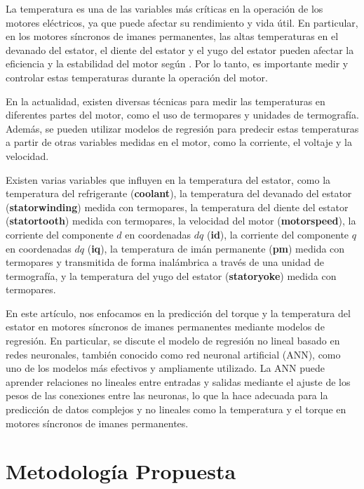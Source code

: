 \documentclass{article}
\begin{document}
La temperatura es una de las variables más críticas en la operación de los motores eléctricos, ya que puede afectar su rendimiento y vida útil. En particular, en los motores síncronos de imanes permanentes, las altas temperaturas en el devanado del estator, el diente del estator y el yugo del estator pueden afectar la eficiencia y la estabilidad del motor según \cite{li2022global}. Por lo tanto, es importante medir y controlar estas temperaturas durante la operación del motor.

En la actualidad, existen diversas técnicas para medir las temperaturas en diferentes partes del motor, como el uso de termopares y unidades de termografía. Además, se pueden utilizar modelos de regresión para predecir estas temperaturas a partir de otras variables medidas en el motor, como la corriente, el voltaje y la velocidad.

Existen varias variables que influyen en la temperatura del estator, como la temperatura del refrigerante (\textbf{coolant}), la temperatura del devanado del estator (\textbf{stator\textunderscore winding}) medida con termopares, la temperatura del diente del estator (\textbf{stator\textunderscore tooth}) medida con termopares, la velocidad del motor (\textbf{motor\textunderscore speed}), la corriente del componente $d$ en coordenadas $dq$ (\textbf{i\textunderscore d}), la corriente del componente $q$ en coordenadas $dq$ (\textbf{i\textunderscore q}), la temperatura de imán permanente (\textbf{pm}) medida con termopares y transmitida de forma inalámbrica a través de una unidad de termografía, y la temperatura del yugo del estator (\textbf{stator\textunderscore yoke}) medida con termopares.


En este artículo, nos enfocamos en la predicción del torque y la temperatura del estator en motores síncronos de imanes permanentes mediante modelos de regresión. En particular, se discute el modelo de regresión no lineal basado en redes neuronales, también conocido como red neuronal artificial (ANN), como uno de los modelos más efectivos y ampliamente utilizado. La ANN puede aprender relaciones no lineales entre entradas y salidas mediante el ajuste de los pesos de las conexiones entre las neuronas, lo que la hace adecuada para la predicción de datos complejos y no lineales como la temperatura y el torque en motores síncronos de imanes permanentes.

\section{Metodología Propuesta}
\end{document}
